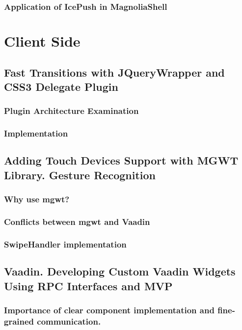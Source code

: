 \subsubsection{Application of IcePush in MagnoliaShell}

\section{Client Side}

\subsection{Fast Transitions with JQueryWrapper and CSS3 Delegate Plugin}

\subsubsection{Plugin Architecture Examination}

\subsubsection{Implementation}

\subsection{Adding Touch Devices Support with MGWT Library. Gesture Recognition}

\subsubsection{Why use mgwt?}

\subsubsection{Conflicts between mgwt and Vaadin}

\subsubsection{SwipeHandler implementation}

\subsection{Vaadin. Developing Custom Vaadin Widgets Using RPC Interfaces and MVP}

\subsubsection{Importance of clear component implementation and fine-grained communication.}

